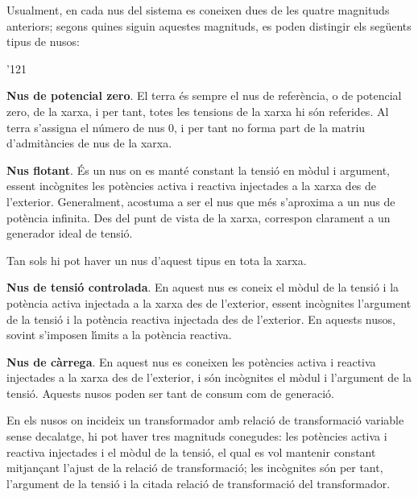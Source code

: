 Usualment, en cada nus del sistema es coneixen dues de les quatre
magnituds anteriors; segons quines siguin aquestes magnituds, es
poden distingir els seg\"{u}ents tipus de nusos:
\begin{dinglist}{'121}
    \item \textbf{Nus de potencial zero}. El terra \'{e}s sempre el nus de refer\`{e}ncia, o de potencial zero, de la
    xarxa, i per tant, totes les tensions de la xarxa hi s\'{o}n referides.
    Al terra s'assigna el n\'{u}mero de nus 0, i per tant no forma part de la matriu d'admit\`{a}ncies de nus de la xarxa.

   \item \textbf{Nus flotant}. \'{E}s un nus on es mant\'{e} constant la tensi\'{o} en m\`{o}dul i argument,
   essent inc\`{o}gnites les pot\`{e}ncies activa i reactiva injectades a la xarxa des de l'exterior.
    Generalment, acostuma a ser el nus que m\'{e}s s'aproxima a un nus de pot\`{e}ncia infinita. Des del
    punt de vista de la xarxa, correspon clarament a un generador ideal de tensi\'{o}.

Tan sols hi pot haver un nus d'aquest tipus en tota la xarxa.
   \item \textbf{Nus de tensi\'{o} controlada}. En aquest nus es coneix el m\`{o}dul de la tensi\'{o} i la
   pot\`{e}ncia activa injectada a la xarxa des de l'exterior, essent inc\`{o}gnites l'argument de la tensi\'{o} i la pot\`{e}ncia
   reactiva injectada des de l'exterior. En aquests nusos, sovint s'imposen l\'{\i}mits a la pot\`{e}ncia reactiva.

   \item \textbf{Nus de c\`{a}rrega}. En aquest nus es coneixen les pot\`{e}ncies activa i reactiva
   injectades a la xarxa des de l'exterior, i s\'{o}n inc\`{o}gnites el m\`{o}dul i l'argument de la tensi\'{o}.
   Aquests nusos poden ser tant de consum com de generaci\'{o}.

En els nusos on incideix un transformador amb relaci\'{o} de
transformaci\'{o} variable sense decalatge, hi pot haver tres magnituds
conegudes: les pot\`{e}ncies activa i reactiva injectades i el m\`{o}dul de
la tensi\'{o}, el qual es vol mantenir constant mitjan\c{c}ant l'ajust de la
relaci\'{o} de transformaci\'{o}; les inc\`{o}gnites s\'{o}n per tant, l'argument de
la tensi\'{o} i la citada relaci\'{o} de transformaci\'{o} del transformador.
\end{dinglist}

